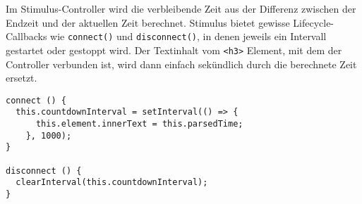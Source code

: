 Im Stimulus-Controller wird die verbleibende Zeit aus der Differenz zwischen der Endzeit und der aktuellen Zeit berechnet.
Stimulus bietet gewisse Lifecycle-Callbacks wie \texttt{connect()} und \texttt{disconnect()},
in denen jeweils ein Intervall gestartet oder gestoppt wird. Der Textinhalt vom \texttt{<h3>} Element, mit dem der Controller
verbunden ist, wird dann einfach sekündlich durch die berechnete Zeit ersetzt.

\begin{codebox}
\begin{verbatim}
connect () {
  this.countdownInterval = setInterval(() => {
      this.element.innerText = this.parsedTime;
    }, 1000);
}

disconnect () {
  clearInterval(this.countdownInterval);
}
\end{verbatim}
\end{codebox}
